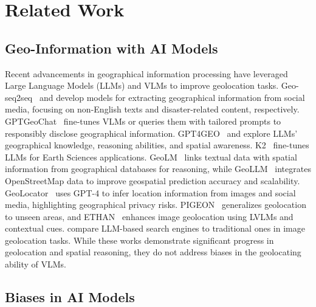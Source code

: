 \section{Related Work}

\subsection{Geo-Information with AI Models}

Recent advancements in geographical information processing have leveraged Large Language Models (LLMs) and VLMs to improve geolocation tasks.
Geo-seq2seq~\cite{zhang2023geo} and \citet{hu2023geo} develop models for extracting geographical information from social media, focusing on non-English texts and disaster-related content, respectively.
GPTGeoChat~\cite{mendes2024granular} fine-tunes VLMs or queries them with tailored prompts to responsibly disclose geographical information.
GPT4GEO~\cite{roberts2023gpt4geo} and \citet{bhandari2023large} explore LLMs' geographical knowledge, reasoning abilities, and spatial awareness.
K2~\cite{deng2024k2} fine-tunes LLMs for Earth Sciences applications.
GeoLM~\cite{li2023geolm} links textual data with spatial information from geographical databases for reasoning, while GeoLLM~\cite{manvi2024geollm} integrates OpenStreetMap data to improve geospatial prediction accuracy and scalability.
GeoLocator~\cite{yang2024geolocator} uses GPT-4 to infer location information from images and social media, highlighting geographical privacy risks.
PIGEON~\cite{haas2024pigeon} generalizes geolocation to unseen areas, and ETHAN~\cite{liu2024image} enhances image geolocation using LVLMs and contextual cues.
\citet{wazzan2024comparing} compare LLM-based search engines to traditional ones in image geolocation tasks.
While these works demonstrate significant progress in geolocation and spatial reasoning, they do not address biases in the geolocating ability of VLMs.

\subsection{Biases in AI Models}

